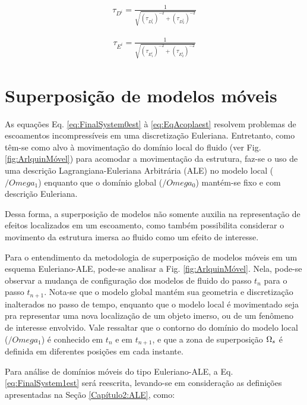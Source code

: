 \documentclass[tese_patricia]{subfiles}
\begin{document}
\begin{align}
	\tau_{D^{i}} = \frac{1}{\sqrt{ \left(\tau_{D_1^{i}}\right)^{-2} + \left(\tau_{D_2^{i}}\right)^{-2} } }
\end{align}

\begin{align}
	\tau_{E^{i}} = \frac{1}{\sqrt{ \left(\tau_{E_1^{i}}\right)^{-2} + \left(\tau_{E_2^{i}}\right)^{-2} } }
\end{align}




\section{Superposição de modelos móveis}

As equações Eq. \ref{eq:FinalSystem0est} à \ref{eq:EqAcoplaest} resolvem problemas de escoamentos incompressíveis em uma discretização Euleriana. Entretanto, como têm-se como alvo à movimentação do domínio local do fluido (ver Fig. \ref{fig:ArlquinMóvel}) para acomodar a movimentação da estrutura, faz-se o uso de uma descrição Lagrangiana-Euleriana Arbitrária (ALE) no modelo local ($/Omega_1$) enquanto que o domínio global ($/Omega_0$) mantém-se fixo e com descrição Euleriana. 

Dessa forma, a superposição de modelos não somente auxilia na representação de efeitos localizados em um escoamento, como também possibilita considerar o movimento da estrutura imersa ao fluido como um efeito de interesse.

Para o entendimento da metodologia de superposição de modelos móveis em um esquema Euleriano-ALE, pode-se analisar a Fig. \ref{fig:ArlquinMóvel}. Nela, pode-se observar a mudança de configuração dos modelos de fluido do passo $t_n$ para o passo $t_{n+1}$. Nota-se que o modelo global mantém sua geometria e discretização inalterados no passo de tempo, enquanto que o modelo local é movimentado seja pra representar uma nova localização de um objeto imerso, ou de um fenômeno de interesse envolvido. Vale ressaltar que o contorno do domínio do modelo local ($/Omega_1$) é conhecido em $t_n$ e em $t_{n+1}$, e que a zona de superposição $\Omega_s$ é definida em diferentes posições em cada instante.


Para análise de domínios móveis do tipo Euleriano-ALE, a Eq. \ref{eq:FinalSystem1est} será reescrita, levando-se em consideração as definições apresentadas na Seção \ref{Capítulo2:ALE}, como:
\end{document}
